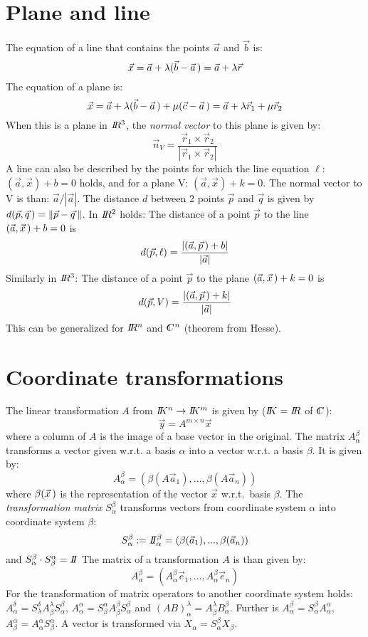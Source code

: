 \documentclass[a4paper,fancyheadings,twoside]{report}
\begin{document}
\section{Plane and line}
The equation of a line that contains the points $\vec{a}$ and $\vec{b}$ is:
\[
\vec{x}=\vec{a}+\lambda(\vec{b}-\vec{a}\,)=\vec{a}+\lambda\vec{r}
\]
The equation of a plane is:
\[
\vec{x}=\vec{a}+\lambda(\vec{b}-\vec{a}\,)+\mu(\vec{c}-\vec{a}\,)=\vec{a}+\lambda\vec{r}_1+\mu\vec{r}_2
\]
When this is a plane in $I\hspace{-1mm}R^3$, the {\it normal vector} to this plane is given
by:
\[
\vec{n}_V=\frac{\vec{r}_1\times\vec{r}_2}{|\vec{r}_1\times\vec{r}_2|}
\]
A line can also be described by the points for which the line equation
$\ell$: $(\vec{a},\vec{x})+b=0$ holds, and for a plane V: $(\vec{a},\vec{x})+k=0$.
The normal vector to V is than: $\vec{a}/|\vec{a}|$.
\npar
The distance $d$ between 2 points $\vec{p}$ and $\vec{q}$ is given by
$d(\vec{p},\vec{q}\,)=\|\vec{p}-\vec{q}\,\|$.
\npar
In $I\hspace{-1mm}R^2$ holds:
The distance of a point $\vec{p}$ to the line $(\vec{a},\vec{x}\,)+b=0$ is
\[
d(\vec{p},\ell)=\frac{|(\vec{a},\vec{p}\,)+b|}{|\vec{a}|}
\]
Similarly in $I\hspace{-1mm}R^3$:
The distance of a point $\vec{p}$ to the plane $(\vec{a},\vec{x}\,)+k=0$ is
\[
d(\vec{p},V)=\frac{|(\vec{a},\vec{p}\,)+k|}{|\vec{a}|}
\]
This can be generalized for $I\hspace{-1mm}R^n$ and $\CC^n$ (theorem from Hesse).

\section{Coordinate transformations}
The linear transformation $A$ from $I\hspace{-1mm}K^n\rightarrow I\hspace{-1mm}K^m$ is given by
($I\hspace{-1mm}K=I\hspace{-1mm}R$ of $\CC$):
\[
\vec{y}=A^{m\times n}\vec{x}
\]
where a column of $A$ is the image of a base vector in the original.
\npar
The matrix $A_\alpha^\beta$ transforms a vector given w.r.t. a basis
$\alpha$ into a vector w.r.t. a basis $\beta$. It is given by:
\[
A_\alpha^\beta=\left(\beta(A\vec{a}_1),...,\beta(A\vec{a}_n)\right)
\]
where $\beta(\vec{x}\,)$ is the representation of the vector $\vec{x}$
w.r.t.\ basis $\beta$.
\npar
The {\it transformation matrix} $S_\alpha^\beta$ transforms vectors from
coordinate system $\alpha$ into coordinate system $\beta$:
\[
S_\alpha^\beta:=I\hspace{-1mm}I_\alpha^\beta=\left(\beta(\vec{a}_1),...,\beta(\vec{a}_n)\right)
\]
and $S_\alpha^\beta\cdot S_\beta^\alpha=I\hspace{-1mm}I$
\npar
The matrix of a transformation $A$ is than given by:
\[
A_\alpha^\beta=\left(A_\alpha^\beta\vec{e}_1,...,A_\alpha^\beta\vec{e}_n\right)
\]
For the transformation of matrix operators to another coordinate system holds:
$A_\alpha^\delta=S_\lambda^\delta A_\beta^\lambda S_\alpha^\beta$,
$A_\alpha^\alpha=S_\beta^\alpha A_\beta^\beta S_\alpha^\beta$ and
$(AB)_\alpha^\lambda=A_\beta^\lambda B_\alpha^\beta$.
\npar
Further is $A_\alpha^\beta=S_\alpha^\beta A_\alpha^\alpha$,
$A_\beta^\alpha=A_\alpha^\alpha S_\beta^\alpha$. A vector is transformed via
$X_\alpha=S_\alpha^\beta X_\beta$.
\end{document}
